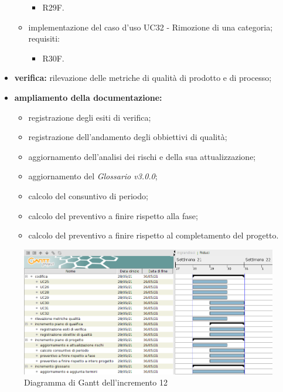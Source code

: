 \begin{itemize}
\begin{itemize}
\begin{itemize}
                        \item R29F.
                    \end{itemize}
              \item implementazione del caso d'uso UC32 -  Rimozione di una categoria;\\
                    requisiti:
                    \begin{itemize}
                        \item R30F.
                    \end{itemize}
          \end{itemize}
    \item \textbf{verifica:} rilevazione delle metriche di qualità di prodotto e di processo;
    \item \textbf{ampliamento della documentazione:}
          \begin{itemize}
              \item registrazione degli esiti di verifica;
              \item registrazione dell'andamento degli obbiettivi di qualità;
              \item aggiornamento dell'analisi dei rischi e della sua attualizzazione;
              \item aggiornamento del \textit{Glossario v3.0.0};
              \item calcolo del consuntivo di periodo;
              \item calcolo del preventivo a finire rispetto alla fase;
              \item calcolo del preventivo a finire rispetto al completamento del progetto.
          \end{itemize}
\end{itemize}
\begin{figure}[!ht]
    \caption{Diagramma di Gantt dell'incremento 12}
    \vspace{5px}
    \includegraphics[scale=0.3]{../../../Images/Diagrammi/Gantt/incremento12.png}
    \centering
\end{figure}

